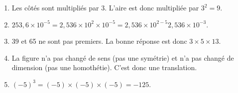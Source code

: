
\begin{enumerate}
    \vspace*{1em}\item Les côtés sont multipliés par 3. L'aire est donc multipliée par $3^2=9$. 
    \vspace*{1em}\item $253,6\times 10^{-5}=2,536\times 10^{2}\times 10^{-5}=2,536\times 10^{2-5}2,536\times 10^{-3}$. 
    \vspace*{1em}\item 39 et 65 ne sont pas premiers. La bonne réponse est donc $3\times 5\times 13$. 
    \vspace*{1em}\item La figure n'a pas changé de sens (pas une symétrie) et n'a pas changé de dimension (pas une homothétie). C'est donc une translation. 
    \vspace*{1em}\item $(-5)^3=(-5)\times (-5)\times (-5)=-125$. 
\end{enumerate}


